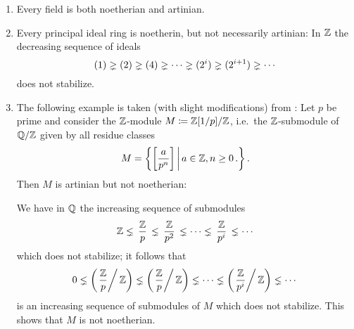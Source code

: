 \begin{example}
  \label{example: noetherian and artinian rings and modules}
  \leavevmode
  \begin{enumerate}
    \item
      Every field is both noetherian and artinian.

    \item
      \label{enumerate: noetherian but not artinian}
      Every principal ideal ring is noetherin, but not necessarily artinian:
      In $\mathbb{Z}$ the decreasing sequence of ideals
      \[
                    (1)
        \gneq (2)
        \gneq (4)
        \gneq \dotsb
        \gneq (2^i)
        \gneq (2^{i+1})
        \gneq \dotsb
      \]
      does not stabilize.
      
    \item
      \label{enumerate: artinian but not noetherian}
      The following example is taken (with slight modifications) from \cite[Chapter~6]{AtiyahMacdonald}:
      Let $p$ be prime and consider the $\mathbb{Z}$-module $M \coloneqq \mathbb{Z}[1/p]/\mathbb{Z}$, i.e.\ the $\mathbb{Z}$-submodule of $\mathbb{Q}/\mathbb{Z}$ given by all residue classes
      \[
          M
        = \left\{
            \left[ \frac{a}{p^n} \right]
          \suchthat*
            a \in \Integer,
            n \geq 0 \,.
          \right\}.
      \]
      Then $M$ is artinian but not noetherian:
      
      We have in $\mathbb{Q}$ the increasing sequence of submodules
      \[
                    \mathbb{Z}
        \lneq \,\frac{\mathbb{Z}}{p}\,
        \lneq \,\frac{\mathbb{Z}}{p^2}\,
        \lneq \dotsb
        \lneq \,\frac{\mathbb{Z}}{p^i}\,
        \lneq \dotsb
      \]
      which does not stabilize;
      it follows that
      \[
                    0
        \lneq \left( \left. \frac{\mathbb{Z}}{p} \right/\mathbb{Z} \right)
        \lneq \left( \left. \frac{\mathbb{Z}}{p} \right/\mathbb{Z} \right)
        \lneq \dotsb
        \lneq \left( \left. \frac{\mathbb{Z}}{p^i} \right/\mathbb{Z} \right)
        \lneq \dotsb
      \]
      is an increasing sequence of submodules of $M$ which does not stabilize.
      This shows that $M$ is not noetherian.
      

\end{enumerate}
\end{example}
